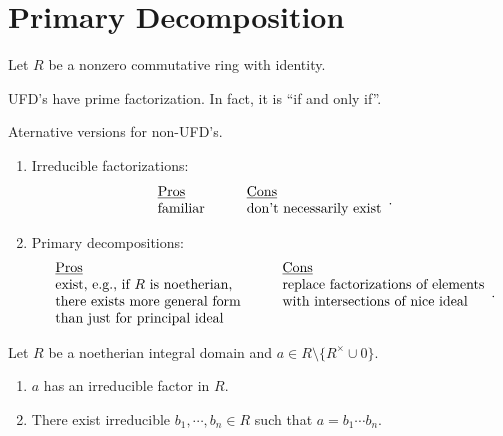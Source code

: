 \chapter{Primary Decomposition}

Let $R$ be a nonzero commutative ring with identity.

\begin{discussion}
    UFD's have prime factorization. In fact, it is ``if and only if''. \par 
    Aternative versions for non-UFD's.
    \begin{enumerate}
        \item Irreducible factorizations: 
            \[
                \begin{array}{llll}
                    \text{\underline{Pros}} &&& \text{\underline{Cons}} \\
                    \text{familiar} &&& \text{don't necessarily exist} 
                \end{array}.
            \]
        \item 
            Primary decompositions:
            \[
                \begin{array}{llll}
                    \text{\underline{Pros}} &&& \text{\underline{Cons}} \\
                    \text{exist, e.g., if $R$ is noetherian,} &&& \text{replace factorizations of elements} \\
                    \text{there exists more general form} &&& \text{with intersections of nice ideal} \\
                    \text{than just for principal ideal}
                \end{array}.
            \]
    \end{enumerate}
\end{discussion}

\begin{theorem}
    Let $R$ be a noetherian integral domain and $a \in R \setminus \{R^{\times} \cup 0\}$.
    \begin{enumerate}
        \item $a$ has an irreducible factor in $R$.
        \item There exist irreducible $b_1,\cdots,b_n \in R$ such that $a = b_1 \cdots b_n$.
    \end{enumerate}
\end{theorem}

